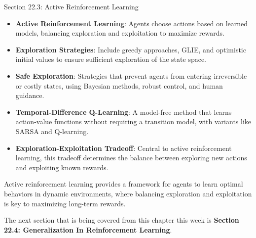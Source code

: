 \begin{notes}{Section 22.3: Active Reinforcement Learning}
\begin{highlight}
        \begin{itemize}
            \item \textbf{Active Reinforcement Learning}: Agents choose actions based on learned models, balancing exploration and exploitation to maximize rewards.
            \item \textbf{Exploration Strategies}: Include greedy approaches, GLIE, and optimistic initial values to ensure sufficient exploration of the state space.
            \item \textbf{Safe Exploration}: Strategies that prevent agents from entering irreversible or costly states, using Bayesian methods, robust control, and human guidance.
            \item \textbf{Temporal-Difference Q-Learning}: A model-free method that learns action-value functions without requiring a transition model, with variants like SARSA and Q-learning.
            \item \textbf{Exploration-Exploitation Tradeoff}: Central to active reinforcement learning, this tradeoff determines the balance between exploring new actions and exploiting known rewards.
        \end{itemize}
    
        Active reinforcement learning provides a framework for agents to learn optimal behaviors in dynamic environments, where balancing exploration and exploitation is key to maximizing long-term rewards.
    
    \end{highlight}
\end{notes}

The next section that is being covered from this chapter this week is \textbf{Section 22.4: Generalization In Reinforcement Learning}.

